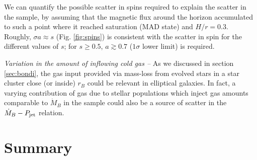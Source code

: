 \documentclass[useAMS,usenatbib]{mn2e}
\begin{document}
We can quantify the possible scatter in spins required to explain the scatter in the sample, by assuming that the magnetic flux around the horizon accumulated to such a point where it reached saturation (MAD state) and $H/r=0.3$. Roughly, $\sigma a \approx s$ (Fig. \ref{fig:spins}) is consistent with the scatter in spin for the different values of $s$; for $s \geq 0.5$, $a \gtrsim 0.7$ ($1\sigma$ lower limit) is required.

\vspace{0.2cm}
\noindent
{\it Variation in the amount of inflowing cold gas --}
As we discussed in section \ref{sec:bondi}, the gas input provided via mass-loss from evolved stars in a star cluster close (or inside) $r_B$ could be relevant in elliptical galaxies. In fact, a varying contribution of gas due to stellar populations which inject gas amounts comparable to $\dot{M}_B$ in the sample could also be a source of scatter in the $\dot{M}_B-P_{\rm jet}$ relation.

\begin{comment}
\subsection{The case of Centaurus A}

WHY IS THE EFFICIENCY FOR CEN A SO HIGH? IS THERE ANYTHING UNUSUAL IN THE X-RAY PROPERTIES OF THIS OBJECT?
Looking more carefully into the data published by Russell+13, I realized that the cavity power remains the same as the one published by Allen+06. However, what really changed is the bondi rate i.e. their density estimate which is 5x lower (compared to allen). 
%
I think I understand the difference. Russell computes the density based on the beta fit, kind of taking into account the fact that the density profile flattens towards Rb. Allen use a power-law model which results in a much bigger estimate for the density as the russell fits indicate.
\end{comment}









\section{Summary}	\label{sec:end}
\end{document}
